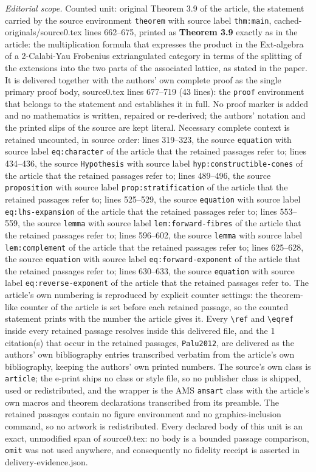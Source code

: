 \documentclass[10pt,a4paper]{amsart}
\numberwithin{equation}{section}
\theoremstyle{definition}
\begin{document}
\noindent\textit{Editorial scope.} Counted unit: original Theorem 3.9 of the article, the statement carried by the source environment \texttt{theorem} with source label \texttt{thm:main}, cached-originals/source0.tex lines 662--675, printed as \textbf{Theorem 3.9} exactly as in the article: the multiplication formula that expresses the product in the Ext-algebra of a 2-Calabi-Yau Frobenius extriangulated category in terms of the splitting of the extensions into the two parts of the associated lattice, as stated in the paper. It is delivered together with the authors' own complete proof as the single primary proof body, source0.tex lines 677--719 (43 lines): the \texttt{proof} environment that belongs to the statement and establishes it in full. No proof marker is added and no mathematics is written, repaired or re-derived; the authors' notation and the printed slips of the source are kept literal. Necessary complete context is retained uncounted, in source order: lines 319--323, the source \texttt{equation} with source label \texttt{eq:character} of the article that the retained passages refer to; lines 434--436, the source \texttt{Hypothesis} with source label \texttt{hyp:constructible-cones} of the article that the retained passages refer to; lines 489--496, the source \texttt{proposition} with source label \texttt{prop:stratification} of the article that the retained passages refer to; lines 525--529, the source \texttt{equation} with source label \texttt{eq:lhs-expansion} of the article that the retained passages refer to; lines 553--559, the source \texttt{lemma} with source label \texttt{lem:forward-fibres} of the article that the retained passages refer to; lines 596--602, the source \texttt{lemma} with source label \texttt{lem:complement} of the article that the retained passages refer to; lines 625--628, the source \texttt{equation} with source label \texttt{eq:forward-exponent} of the article that the retained passages refer to; lines 630--633, the source \texttt{equation} with source label \texttt{eq:reverse-exponent} of the article that the retained passages refer to. The article's own numbering is reproduced by explicit counter settings: the theorem-like counter of the article is set before each retained passage, so the counted statement prints with the number the article gives it. Every \texttt{\textbackslash ref} and \texttt{\textbackslash eqref} inside every retained passage resolves inside this delivered file, and the 1 citation(s) that occur in the retained passages, \texttt{Palu2012}, are delivered as the authors' own bibliography entries transcribed verbatim from the article's own bibliography, keeping the authors' own printed numbers. The source's own class is \texttt{article}; the e-print ships no class or style file, so no publisher class is shipped, used or redistributed, and the wrapper is the AMS \texttt{amsart} class with the article's own macros and theorem declarations transcribed from its preamble. The retained passages contain no figure environment and no graphics-inclusion command, so no artwork is redistributed. Every declared body of this unit is an exact, unmodified span of source0.tex: no body is a bounded passage comparison, \texttt{omit} was not used anywhere, and consequently no fidelity receipt is asserted in delivery-evidence.json. 
\end{document}
